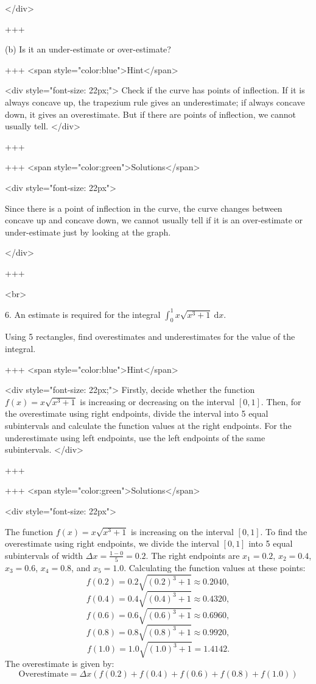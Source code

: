 </div>

+++

(b) Is it an under-estimate or over-estimate?

+++ <span style="color:blue">Hint</span>

<div style="font-size: 22px;">
Check if the curve has points of inflection. If it is always concave up, the trapezium rule gives an underestimate; if always concave down, it gives an overestimate. But if there are points of inflection, we cannot usually tell.
</div>

+++

+++ <span style="color:green">Solutions</span>

<div style="font-size: 22px">

Since there is a point of inflection in the curve, the curve changes between concave up and concave down, we cannot usually tell if it is an over-estimate or under-estimate just by looking at the graph.

</div>

+++

<br>

6. An estimate is required for the integral $\int_{0}^{1} x \sqrt{x^{3}+1} \mathrm{~d} x$.

Using 5 rectangles, find overestimates and underestimates for the value of the integral.

+++ <span style="color:blue">Hint</span>

<div style="font-size: 22px;">
Firstly, decide whether the function \(f(x) = x \sqrt{x^3 + 1}\) is increasing or decreasing on the interval \([0, 1]\). Then, for the overestimate using right endpoints, divide the interval into 5 equal subintervals and calculate the function values at the right endpoints. For the underestimate using left endpoints, use the left endpoints of the same subintervals.
</div>

+++

+++ <span style="color:green">Solutions</span>

<div style="font-size: 22px">

The function \(f(x) = x \sqrt{x^3 + 1}\) is increasing on the interval \([0, 1]\).
To find the overestimate using right endpoints, we divide the interval \([0, 1]\) into 5 equal subintervals of width \(\Delta x = \frac{1-0}{5} = 0.2\). The right endpoints are \(x_1 = 0.2\), \(x_2 = 0.4\), \(x_3 = 0.6\), \(x_4 = 0.8\), and \(x_5 = 1.0\).
Calculating the function values at these points:
\[f(0.2) = 0.2 \sqrt{(0.2)^3 + 1} \approx 0.2040,\]
\[f(0.4) = 0.4 \sqrt{(0.4)^3 + 1} \approx 0.4320,\]
\[f(0.6) = 0.6 \sqrt{(0.6)^3 + 1} \approx 0.6960,\]
\[f(0.8) = 0.8 \sqrt{(0.8)^3 + 1} \approx 0.9920,\]
\[f(1.0) = 1.0 \sqrt{(1.0)^3 + 1} = 1.4142.\]
The overestimate is given by:
\[\text{Overestimate} = \Delta x \left( f(0.2) + f(0.4) + f(0.6) + f(0.8) + f(1.0) \right)\]

